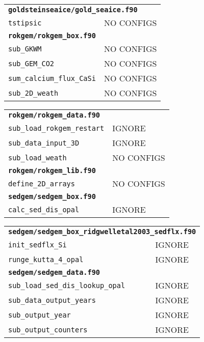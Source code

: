 \documentclass[a4paper,10pt,article]{memoir}
\begin{document}
\begin{tabular}{ll}
  \multicolumn{2}{l}{\textbf{\texttt{goldsteinseaice/gold\_seaice.f90}}} \\
  \texttt{tstipsic}        & NO CONFIGS \\

  \multicolumn{2}{l}{\textbf{\texttt{rokgem/rokgem\_box.f90}}} \\
  \texttt{sub\_GKWM}                & NO CONFIGS \\
  \texttt{sub\_GEM\_CO2}            & NO CONFIGS \\
  \texttt{sum\_calcium\_flux\_CaSi} & NO CONFIGS \\
  \texttt{sub\_2D\_weath}           & NO CONFIGS \\
\end{tabular}

\begin{tabular}{ll}
  \multicolumn{2}{l}{\textbf{\texttt{rokgem/rokgem\_data.f90}}} \\
  \texttt{sub\_load\_rokgem\_restart} & IGNORE \\
  \texttt{sub\_data\_input\_3D}       & IGNORE \\
  \texttt{sub\_load\_weath}           & NO CONFIGS \\

  \multicolumn{2}{l}{\textbf{\texttt{rokgem/rokgem\_lib.f90}}} \\
  \texttt{define\_2D\_arrays} & NO CONFIGS \\

  \multicolumn{2}{l}{\textbf{\texttt{sedgem/sedgem\_box.f90}}} \\
  \texttt{calc\_sed\_dis\_opal}  & IGNORE \\
\end{tabular}

\begin{tabular}{ll}
  \multicolumn{2}{l}{\textbf{\texttt{sedgem/sedgem\_box\_ridgwelletal2003\_sedflx.f90}}} \\
  \texttt{init\_sedflx\_Si}      & IGNORE \\
  \texttt{runge\_kutta\_4\_opal} & IGNORE \\

  \multicolumn{2}{l}{\textbf{\texttt{sedgem/sedgem\_data.f90}}} \\
  \texttt{sub\_load\_sed\_dis\_lookup\_opal} & IGNORE \\
  \texttt{sub\_data\_output\_years}          & IGNORE \\
  \texttt{sub\_output\_year}                 & IGNORE \\
  \texttt{sub\_output\_counters}             & IGNORE
\end{tabular}
\end{document}
